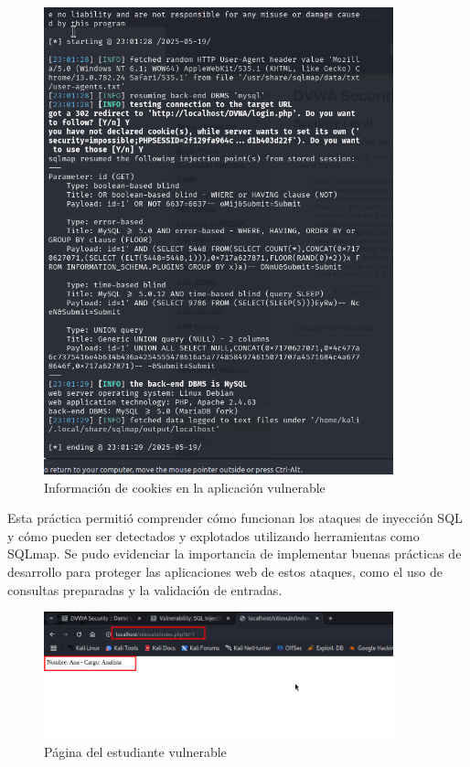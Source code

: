 \documentclass[12pt,a4paper]{article}
\begin{document}
\begin{figure}[H]
    \centering
    \includegraphics[width=0.9\textwidth]{cookie.png}
    \caption{Información de cookies en la aplicación vulnerable}
    \label{fig:cookie}
\end{figure}

Esta práctica permitió comprender cómo funcionan los ataques de inyección SQL y cómo pueden ser detectados y explotados utilizando herramientas como SQLmap. Se pudo evidenciar la importancia de implementar buenas prácticas de desarrollo para proteger las aplicaciones web de estos ataques, como el uso de consultas preparadas y la validación de entradas.

\begin{figure}[H]
    \centering
    \includegraphics[width=0.9\textwidth]{pagina_estudiante.png}
    \caption{Página del estudiante vulnerable}
    \label{fig:pagina_estudiante}
\end{figure}
\end{document}
